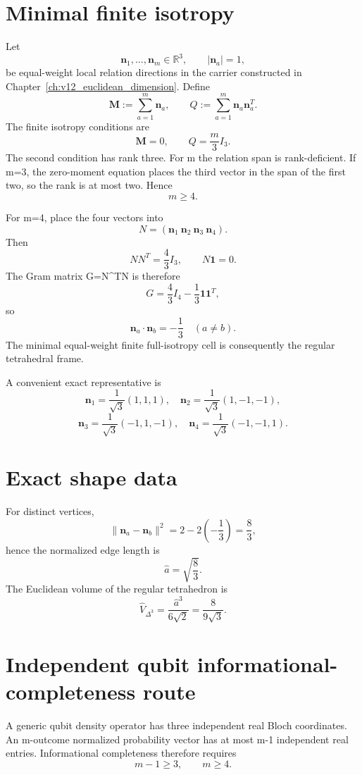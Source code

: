 \documentclass[11pt,a4paper,twoside]{book}
\def\({}%
\def\){}%
\theoremstyle{definition}
\begin{document}
\section{Minimal finite isotropy}

Let
\[
\mathbf n_1,\ldots,\mathbf n_m\in\mathbb R^3,
\qquad
|\mathbf n_a|=1,
\]
be equal-weight local relation directions in the carrier constructed in
Chapter~\ref{ch:v12_euclidean_dimension}.  Define
\[
\mathbf M:=\sum_{a=1}^{m}\mathbf n_a,
\qquad
Q:=\sum_{a=1}^{m}\mathbf n_a\mathbf n_a^T.
\]
The finite isotropy conditions are
\[
\boxed{\mathbf M=0},
\qquad
\boxed{Q=\frac m3 I_3}.
\]
The second condition has rank three.  For \(m\) the relation span is
rank-deficient.  If \(m=3\), the zero-moment equation places the third vector in
the span of the first two, so the rank is at most two.  Hence
\[
\boxed{m\ge4.}
\]

For \(m=4\), place the four vectors into
\[
N=(\mathbf n_1\ \mathbf n_2\ \mathbf n_3\ \mathbf n_4).
\]
Then
\[
NN^T=\frac43I_3,
\qquad
N\mathbf1=0.
\]
The Gram matrix \(G=N^TN\) is therefore
\[
\boxed{
G
=
\frac43I_4-\frac13\mathbf1\mathbf1^T,
}
\]
so
\[
\boxed{
\mathbf n_a\cdot\mathbf n_b
=
-\frac13
\quad(a\neq b).
}
\]
The minimal equal-weight finite full-isotropy cell is consequently the regular
tetrahedral frame.

A convenient exact representative is
\[
\mathbf n_1=\frac1{\sqrt3}(1,1,1),\quad
\mathbf n_2=\frac1{\sqrt3}(1,-1,-1),
\]
\[
\mathbf n_3=\frac1{\sqrt3}(-1,1,-1),\quad
\mathbf n_4=\frac1{\sqrt3}(-1,-1,1).
\]

\section{Exact shape data}

For distinct vertices,
\[
\|\mathbf n_a-\mathbf n_b\|^2
=
2-2\left(-\frac13\right)
=
\frac83,
\]
hence the normalized edge length is
\[
\boxed{\hat a=\sqrt{\frac83}}.
\]
The Euclidean volume of the regular tetrahedron is
\[
\boxed{
\hat V_{\Delta^3}
=
\frac{\hat a^3}{6\sqrt2}
=
\frac{8}{9\sqrt3}.
}
\]

\section{Independent qubit informational-completeness route}

A generic qubit density operator has three independent real Bloch coordinates.
An \(m\)-outcome normalized probability vector has at most \(m-1\) independent
real entries.  Informational completeness therefore requires
\[
m-1\ge3,
\qquad
\boxed{m\ge4}.
\]
\end{document}
